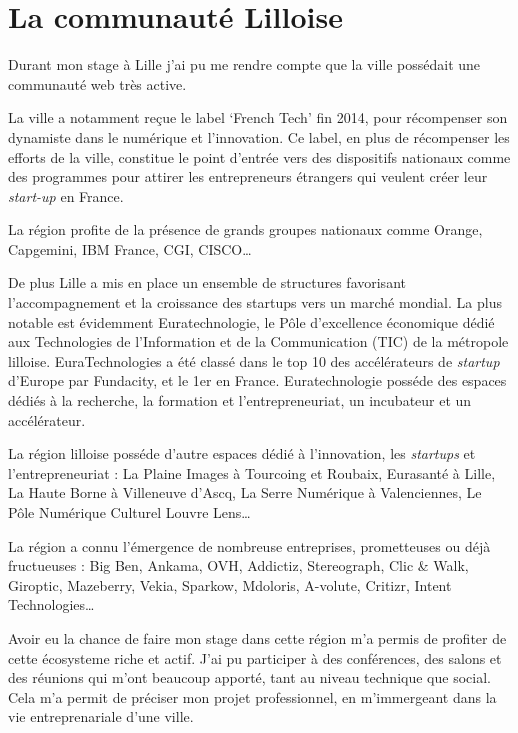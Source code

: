 \newpage

\section{La communauté Lilloise}\label{la-communautuxe9-lilloise}

Durant mon stage à Lille j'ai pu me rendre compte que la ville possédait
une communauté web très active.

\bigskip

La ville a notamment reçue le label `French Tech' fin 2014, pour
récompenser son dynamiste dans le numérique et l'innovation. Ce label,
en plus de récompenser les efforts de la ville, constitue le point
d'entrée vers des dispositifs nationaux comme des programmes pour
attirer les entrepreneurs étrangers qui veulent créer leur
\emph{start-up} en France.

\bigskip

La région profite de la présence de grands groupes nationaux comme
Orange, Capgemini, IBM France, CGI, CISCO\ldots{}

\bigskip

De plus Lille a mis en place un ensemble de structures favorisant
l'accompagnement et la croissance des startups vers un marché mondial.
La plus notable est évidemment Euratechnologie, le Pôle d'excellence
économique dédié aux Technologies de l'Information et de la
Communication (TIC) de la métropole lilloise. EuraTechnologies a été
classé dans le top 10 des accélérateurs de \emph{startup} d'Europe par
Fundacity, et le 1er en France. Euratechnologie posséde des espaces
dédiés à la recherche, la formation et l'entrepreneuriat, un incubateur
et un accélérateur.

\bigskip

La région lilloise posséde d'autre espaces dédié à l'innovation, les
\emph{startups} et l'entrepreneuriat : La Plaine Images à Tourcoing et
Roubaix, Eurasanté à Lille, La Haute Borne à Villeneuve d'Ascq, La Serre
Numérique à Valenciennes, Le Pôle Numérique Culturel Louvre Lens\ldots{}

\bigskip

La région a connu l'émergence de nombreuse entreprises, prometteuses ou
déjà fructueuses : Big Ben, Ankama, OVH, Addictiz, Stereograph, Clic \&
Walk, Giroptic, Mazeberry, Vekia, Sparkow, Mdoloris, A-volute, Critizr,
Intent Technologies\ldots{}

\bigskip

Avoir eu la chance de faire mon stage dans cette région m'a permis de
profiter de cette écosysteme riche et actif. J'ai pu participer à des
conférences, des salons et des réunions qui m'ont beaucoup apporté, tant
au niveau technique que social. Cela m'a permit de préciser mon projet
professionnel, en m'immergeant dans la vie entreprenariale d'une ville.

